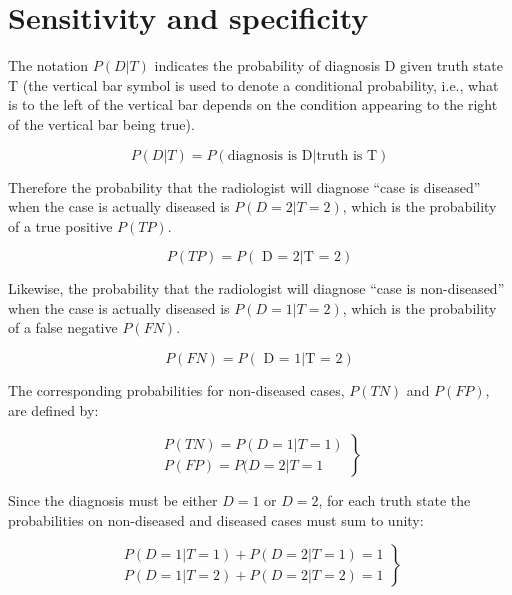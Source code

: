 \documentclass[
]{book}
\begin{document}
\hypertarget{sensitivity-and-specificity}{%
\section{Sensitivity and specificity}\label{sensitivity-and-specificity}}

The notation \(P(D|T)\) indicates the probability of diagnosis D given truth state T (the vertical bar symbol is used to denote a conditional probability, i.e., what is to the left of the vertical bar depends on the condition appearing to the right of the vertical bar being true).

\begin{equation} 
P(D|T) = P(\text{diagnosis is D} | \text{truth is T})
\label{eq:binaryTask0PDGivenT}
\end{equation}

Therefore the probability that the radiologist will diagnose ``case is diseased'' when the case is actually diseased is \(P(D=2|T=2)\), which is the probability of a true positive \(P(TP)\).

\begin{equation} 
P(TP) = P(\text{ D = 2} | \text{T = 2})
\label{eq:binaryTask0PTP}
\end{equation}

Likewise, the probability that the radiologist will diagnose ``case is non-diseased'' when the case is actually diseased is \(P(D=1|T=2)\), which is the probability of a false negative \(P(FN)\).

\begin{equation} 
P(FN) = P(\text{ D = 1} | \text{T = 2})
\label{eq:binaryTask0PFN}
\end{equation}

The corresponding probabilities for non-diseased cases, \(P(TN)\) and \(P(FP)\), are defined by:

\begin{equation} 
\left.\begin{matrix}
P(TN)=P(D=1|T=1)\\ 
P(FP)=P(D=2|T=1
\end{matrix}\right\}
\label{eq:binaryTask0PTNFP}
\end{equation}

Since the diagnosis must be either \(D=1\) or \(D=2\), for each truth state the probabilities on non-diseased and diseased cases must sum to unity:

\begin{equation} 
\left.\begin{matrix}
P(D=1|T=1)+P(D=2|T=1)=1\\ 
P(D=1|T=2)+P(D=2|T=2)=1
\end{matrix}\right\}
\label{eq:binaryTask0PSumsToUnity}
\end{equation}
\end{document}
